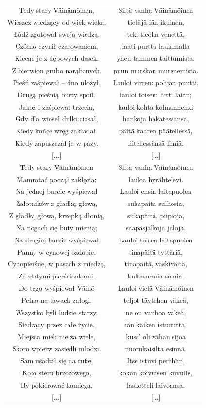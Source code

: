 \documentclass[11pt,a4paper,twoside]{report}
\begin{document}
{\centering
\small
\begin{longtable}{c c}
Tedy stary Väinämöinen,		               &  Siitä vanha Väinämöinen\\
Wieszcz wiedzący od wiek wieka,	&  tietäjä iän-ikuinen,\\
Łódź zgotował swoją wiedzą,		&  teki tieolla venettä,\\
Czółno czynił czarowaniem,		&  laati purtta laulamalla\\
Klecąc je z dębowych desek,		&  yhen tammen taittumista,\\
Z bierwion grubo narąbanych.		&  puun murskan murenemista.\\
Pieśń zaśpiewał – dno ułożył,		&  Lauloi virren: pohjan puutti,\\
Drugą pieśnią burty spoił,		&  lauloi toisen: liitti laian;\\
Jakoż i zaśpiewał trzecią,			&  lauloi kohta kolmannenki\\
Gdy dla wioseł dulki ciosał,		&  hankoja hakatessansa,\\
Kiedy końce wręg zakładał,		&  päitä kaaren päätellessä,\\
Kiedy zapuszczał je w pazy.		&  liitellessänsä limiä.\\
{[...]} 					& {[...]}\\
Tedy stary Väinämöinen			& Siitä vanha Väinämöinen\\
Mamrotać począł zaklęcia: 		& lauloa hyrähtelevi.\\
Na jednej burcie wyśpiewał		& Lauloi ensin laitapuolen\\
Zalotników z gładką głową, 		& sukapäitä sulhosia,\\
Z gładką głową, krzepką dłonią, 		& sukapäitä, piipioja,\\
Na nogach się buty mienią; 		& saapasjalkoja jaloja.\\
Na drugiej burcie wyśpiewał		& Lauloi toisen laitapuolen\\
Panny w cynowej ozdobie, 		& tinapäitä tyttäriä,\\
Cynopierśne, w pasach z miedzą, 		& tinapäitä, vaskivöitä,\\
Ze złotymi pierścionkami. 		& kultasormia somia.\\
Do tego wyśpiewał Väinö		& Lauloi vielä Väinämöinen\\
Pełno na ławach załogi, 			& teljot täytehen väkeä,\\
Wszystko byli ludzie starzy, 		& ne on vanhoa väkeä,\\
Siedzący przez całe życie, 		&  iän kaiken istunutta,\\
Miejsca mieli nie za wiele, 		& kuss' oli vähän sijoa\\
Skoro wpierw zasiedli młodzi. 		& nuorukaisilta esinnä.\\
Sam usadził się na rufie, 			&  Itse istuvi perähän,\\
Koło steru brzozowego, 			& kokan koivuisen kuvulle,\\
By pokierować komiegą, 		& lasketteli laivoansa.\\
{[...]} 					& {[...]}\\
\end{longtable}
}
\end{document}
